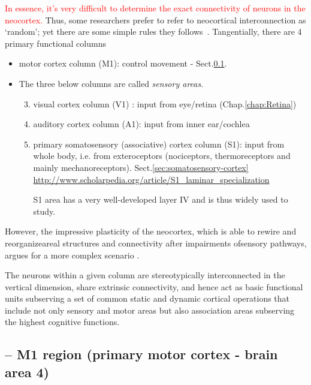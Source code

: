 \textcolor{red}{In essence, it's very difficult to determine the exact
  connectivity of neurons in the neocortex.}
Thus, some researchers prefer to refer to neocortical interconnection as
`random'; yet there are some simple rules they follows~\cite{well2005cnc}.
Tangentially, there are 4 primary functional columns
\begin{itemize}
  \item [1] motor cortex column (M1): control movement -
  Sect.\ref{sec:M1-region}.

  \item [2,3,4] The three below columns are called {\it sensory areas}.
  \begin{enumerate}
    \setcounter{enumi}{2}
  \item visual cortex column (V1) : input from eye/retina (Chap.\ref{chap:Retina})

  \item auditory cortex column (A1): input from inner ear/cochlea

  \item primary somatosensory (associative) cortex column (S1): input from whole
  body, i.e. from exteroceptors (nociceptors, thermoreceptors and mainly
  mechanoreceptors). Sect.\ref{sec:somatosensory-cortex}
\url{http://www.scholarpedia.org/article/S1_laminar_specialization}
  
  S1 area has a very well-developed layer IV and is thus widely used to
  study.
  \end{enumerate}
\end{itemize}

However, the impressive plasticity of the neocortex, which is able to rewire and
reorganizeareal structures and connectivity after impairments ofsensory
pathways, argues for a more complex scenario \citep{alfano2013}.

The neurons within a given column are stereotypically interconnected in the
vertical dimension, share extrinsic connectivity, and hence act as basic
functional units subserving a set of common static and dynamic cortical
operations that include not only sensory and motor areas but also association
areas subserving the highest cognitive functions.

\subsection{-- M1 region (primary motor cortex - brain area 4)}
\label{sec:M1-region}

